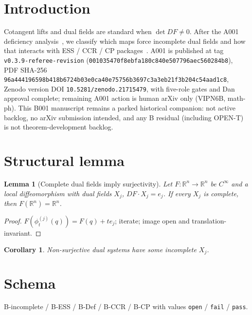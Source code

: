 ﻿\documentclass[11pt]{article}
\newtheorem{lemma}{Lemma}
\newtheorem{corollary}{Corollary}
\begin{document}
\section{Introduction}
Cotangent lifts and dual fields are standard when \(\det DF\neq 0\). After the
A001 deficiency analysis~\cite{A001}, we classify which maps force incomplete
dual fields and how that interacts with ESS / CCR / CP packages~\cite{C001}.
A001 is published at tag \texttt{v0.3.9-referee-revision}
(\texttt{001035470f8ebfa180c840e507796aec560284b8}), PDF SHA-256
\texttt{96a444196598b418b6724b03e0ca40e75756b3697c3a3eb21f3b204c54aad1c8},
Zenodo version DOI \texttt{10.5281/zenodo.21715479}, with five-role gates and
Dan approval complete; remaining A001 action is human arXiv only (VIPN6B,
math-ph). This B001 manuscript remains a parked historical companion: not
active backlog, no arXiv submission intended, and any B residual (including
OPEN-T) is not theorem-development backlog.

\section{Structural lemma}
\begin{lemma}[Complete dual fields imply surjectivity]
\label{lem:B1}
Let \(F:\mathbb{R}^n\to\mathbb{R}^n\) be \(C^\infty\) and a local diffeomorphism
with dual fields \(X_j\), \(DF\cdot X_j=e_j\). If every \(X_j\) is complete, then
\(F(\mathbb{R}^n)=\mathbb{R}^n\).
\end{lemma}
\begin{proof}
\(F(\phi_t^{(j)}(q))=F(q)+te_j\); iterate; image open and translation-invariant.
\end{proof}
\begin{corollary}
Non-surjective dual systems have some incomplete \(X_j\).
\end{corollary}

\section{Schema}
B-incomplete / B-ESS / B-Def / B-CCR / B-CP with values
\texttt{open} / \texttt{fail} / \texttt{pass}.
\end{document}
